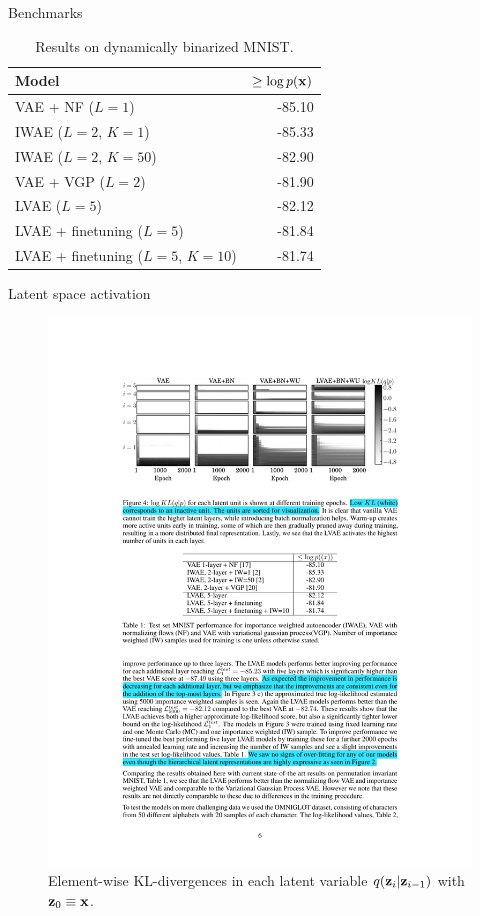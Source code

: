\begin{frame}{Benchmarks}
    \begin{table}[]
        \centering
        \begin{tabular}{lr}
        \toprule
        Model & $\geq \log p({\mathbf{x}})$ \\
        \midrule
        VAE + NF ($L=1$) & -85.10 \\
        IWAE ($L=2$, $K=1$) & -85.33 \\
        IWAE ($L=2$, $K=50$) & -82.90 \\
        VAE + VGP ($L=2$) & -81.90 \\
        \midrule
        LVAE ($L=5$) & -82.12 \\
        LVAE + finetuning ($L=5$) & -81.84 \\
        LVAE + finetuning ($L=5$, $K=10$) & -81.74 \\
        \bottomrule
        \end{tabular}
        \caption{Results on dynamically binarized MNIST.}
    \end{table}
\end{frame}


\begin{frame}{Latent space activation}
    \begin{figure}[\textwidth]
        \centering
        \includegraphics[scale=0.85]{figures/ladder_vae_latent_activations.pdf}
        \caption{Element-wise KL-divergences in each latent variable $q({\mathbf{z}}_i|{\mathbf{z}}_{i-1})$ with ${\mathbf{z}}_0\equiv {\mathbf{x}}$.}
    \end{figure}
\end{frame}


